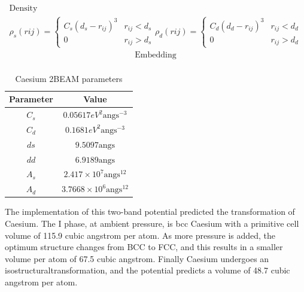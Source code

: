 \begin{equation}
\begin{split}
\text{Density} \\
\rho_s(r{ij}) = \left\{ \begin{matrix}  C_s(d_s - r_{ij})^3 & r_{ij}<d_s \\  0 & r_{ij} > d_s \end{matrix} \right . 
\rho_d(r{ij}) = \left\{ \begin{matrix} C_d(d_d - r_{ij})^3 & r_{ij}<d_d \\  0 & r_{ij} > d_d \end{matrix} \right . 
\end{split}
\label{eq:caesium2beamdensity}
\end{equation}
\begin{equation}
\begin{split}
\text{Embedding} \\
\end{split}
\label{eq:caesium2beamembedding}
\end{equation}

\begin{table}[h]
\begin{center}
\renewcommand{\arraystretch}{1.2}
\begin{tabular}{c c}
\hline\hline
Parameter & Value \\
\hline\hline
$C_s$ & $0.05617 eV^2 \text{angs}^{-3}$ \\
$C_d$ & $0.1681 eV^2 \text{angs}^{-3}$ \\
$ds$  & $9.5097 \text{angs}$ \\
$dd$  & $6.9189 \text{angs}$ \\
$A_s$ & $2.417 \times 10^7 \text{angs}^{12}$ \\
$A_d$ & $3.7668 \times 10^6 \text{angs}^{12}$ \\
\hline\hline
\end{tabular}
\caption{Caesium 2BEAM parameters}
\label{table:caesiumeamparameters}
\end{center}
\end{table}

The implementation of this two-band potential predicted the transformation of Caesium.  The I phase, at ambient pressure, is \acrshort{bcc} Caesium with a primitive cell volume of 115.9 cubic angstrom per atom.  As more pressure is added, the optimum structure changes from BCC to FCC, and this results in a smaller volume per atom of 67.5 cubic angstrom.  Finally Caesium undergoes an \gls{isostructuraltransformation}, and the potential predicts a volume of 48.7 cubic angstrom per atom.

